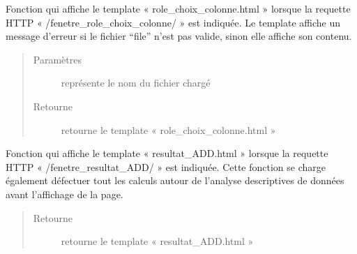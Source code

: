 \documentclass[letterpaper,10pt,openany,oneside,french]{sphinxmanual}
\begin{document}
\begin{fulllineitems}
\label{\detokenize{gestionFlux:interface_web.gestionFlux.fenetre_role_choix_colonne}}
Fonction qui affiche le template « role\_choix\_colonne.html » lorsque la requette HTTP « /fenetre\_role\_choix\_colonne/ » est indiquée.
Le template affiche un message d’erreur si le fichier “file” n’est pas valide, sinon elle affiche son contenu.
\begin{quote}\begin{description}
\item[{Paramètres}] \leavevmode
{} \textendash{} représente le nom du fichier chargé

\item[{Retourne}] \leavevmode
retourne le template « role\_choix\_colonne.html »

\end{description}\end{quote}

\end{fulllineitems}


\begin{fulllineitems}
\label{\detokenize{gestionFlux:interface_web.gestionFlux.fenetre_resultat_ADD}}
Fonction qui affiche le template « resultat\_ADD.html » lorsque la requette HTTP « /fenetre\_resultat\_ADD/ » est indiquée.
Cette fonction se charge également défectuer tout les calculs autour de l’analyse descriptives de données avant l’affichage de la page.
\begin{quote}\begin{description}
\item[{Retourne}] \leavevmode
retourne le template « resultat\_ADD.html »

\end{description}\end{quote}

\end{fulllineitems}

\end{document}
